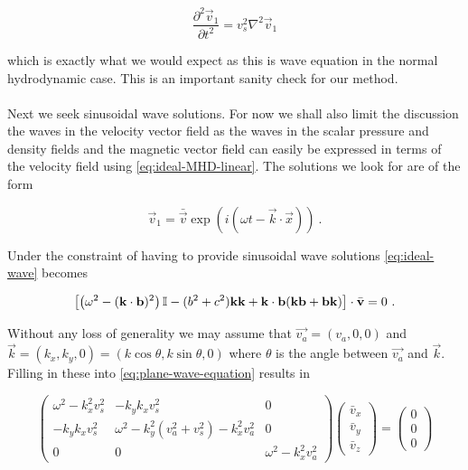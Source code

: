 $$ \frac{\partial^2 \vec{v}_1}{\partial t^2} = v_s^2 \nabla^2 \vec{v}_1 $$

which is exactly what we would expect as this is wave equation in the normal hydrodynamic case. This is an important sanity check for our method.\\
\\

Next we seek sinusoidal wave solutions. 
For now we shall also limit the discussion the waves in the velocity vector field as the waves in the scalar pressure and density fields and the magnetic vector field can easily be expressed in terms of the velocity field using \cref{eq:ideal-MHD-linear}. 
The solutions we look for are of the form

$$ \vec{v}_1 = \bar{\vec{v}} \exp(i(\omega t - \vec{k} \cdot \vec{x})) \ .$$ 

Under the constraint of having to provide sinusoidal wave solutions \cref{eq:ideal-wave} becomes

\begin{equation}
\label{eq:plane-wave-equation}
\left[ \left( \omega^2 - (\mathbf{k}\cdot \mathbf{b})^2 \right) \mathbb{I} - (b^2 + c^2)\mathbf{k}\mathbf{k} + \mathbf{k} \cdot \mathbf{b}(\mathbf{k}\mathbf{b} + \mathbf{b}\mathbf{k}) \right] \cdot \bar{\mathbf{v}} = 0 \ .
\end{equation} 

Without any loss of generality we may assume that $\vec{v_a} = (v_a,0,0)$ and $\vec{k} = (k_x, k_y, 0) = (k\cos\theta, k\sin\theta, 0)$ where $\theta$ is the angle between $\vec{v_a}$ and $\vec{k}$. Filling in these into \cref{eq:plane-wave-equation} results in

\begin{equation}
\label{eq:plane-wave-equation-matrixform}
\begin{pmatrix}
 \omega^ 2-k_x^2 v_s^2  &  - k_y k_x v_s^2  & 0\\
- k_y k_x v_s^2  &  \omega^2  - k_y^2 (v_a^2 + v_s^2) - k_x^2 v_a^2  &  0\\
0  &  0  & \omega^2  -  k_x^2 v_a^2
\end{pmatrix}
\begin{pmatrix}
\bar{v}_x \\
\bar{v}_y \\
\bar{v}_z
\end{pmatrix}
 = 
\begin{pmatrix}
0 \\
0 \\
0
\end{pmatrix}
\end{equation} 

